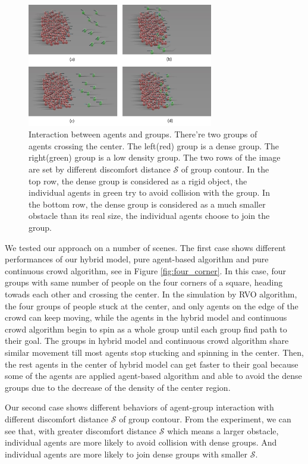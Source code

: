 \documentclass{egpubl}
\begin{document}
\begin{figure}
  \centering
  \includegraphics[width=3.2in]{images/cross}
  \caption{Interaction between agents and groups. There're two groups of agents crossing the center. The left(red) group is a dense group. The right(green) group is a low density group. The two rows of the image are set by different discomfort distance $\mathcal{S}$ of group contour. In the top row, the dense group is considered as a rigid object, the individual agents in green try to avoid collision with the group. In the bottom row, the dense group is considered as a much smaller obstacle than its real size, the individual agents choose to join the group.}
  \label{fig:cross}
\end{figure}

We tested our approach on a number of scenes. The first case shows different performances of our hybrid model, pure agent-based algorithm and pure continuous crowd algorithm, see in Figure \ref{fig:four_corner}. In this case, four groups with same number of people on the four corners of a square, heading towads each other and crossing the center. In the simulation by RVO algorithm, the four groups of people stuck at the center, and only agents on the edge of the crowd can keep moving, while the agents in the hybrid model and continuous crowd algorithm begin to spin as a whole group until each group find path to their goal. The groups in hybrid model and continuous crowd algorithm share similar movement till most agents stop stucking and spinning in the center. Then, the rest agents in the center of hybrid model can get faster to their goal because some of the agents are applied agent-based algorithm and able to avoid the dense groups due to the decrease of the density of the center region.

Our second case shows different behaviors of agent-group interaction with different discomfort distance $\mathcal{S}$ of group contour. From the experiment, we can see that, with greater discomfort distance $\mathcal{S}$ which means a larger obstacle, individual agents are more likely to avoid collision with dense groups. And individual agents are more likely to join dense groups with smaller $\mathcal{S}$.
\end{document}
